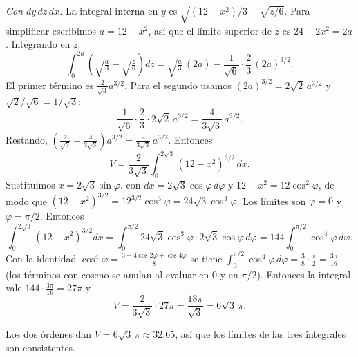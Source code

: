 \begin{respuesta}
    \medskip
    \emph{Con $dy\,dz\,dx$.} La integral interna en $y$ es
    $\sqrt{(12-x^2)/3}-\sqrt{z/6}$. Para simplificar escribimos $a=12-x^2$, así que el
    límite superior de $z$ es $24-2x^2=2a$. Integrando en $z$:
    \[
        \int_0^{2a}\left(\sqrt{\tfrac{a}{3}}-\sqrt{\tfrac{z}{6}}\right)dz
        = \sqrt{\tfrac{a}{3}}\,(2a) - \frac{1}{\sqrt6}\cdot\frac23\,(2a)^{3/2}.
    \]
    El primer término es $\frac{2}{\sqrt3}a^{3/2}$. Para el segundo usamos
    $(2a)^{3/2}=2\sqrt2\,a^{3/2}$ y $\sqrt2/\sqrt6=1/\sqrt3$:
    \[
        \frac{1}{\sqrt6}\cdot\frac23\cdot 2\sqrt2\,a^{3/2} = \frac{4}{3\sqrt3}\,a^{3/2}.
    \]
    Restando, $\left(\frac{2}{\sqrt3}-\frac{4}{3\sqrt3}\right)a^{3/2}=\frac{2}{3\sqrt3}\,a^{3/2}$. Entonces
    \[
        V = \frac{2}{3\sqrt3}\int_0^{2\sqrt3}(12-x^2)^{3/2}\,dx .
    \]
    Sustituimos $x=2\sqrt3\sin\varphi$, con $dx=2\sqrt3\cos\varphi\,d\varphi$ y
    $12-x^2=12\cos^2\varphi$, de modo que $(12-x^2)^{3/2}=12^{3/2}\cos^3\varphi=24\sqrt3\cos^3\varphi$.
    Los límites son $\varphi=0$ y $\varphi=\pi/2$. Entonces
    \[
        \int_0^{2\sqrt3}(12-x^2)^{3/2}dx = \int_0^{\pi/2} 24\sqrt3\cos^3\varphi\cdot 2\sqrt3\cos\varphi\,d\varphi
        = 144\int_0^{\pi/2}\cos^4\varphi\,d\varphi .
    \]
    Con la identidad $\cos^4\varphi=\frac{3+4\cos2\varphi+\cos4\varphi}{8}$ se tiene
    $\int_0^{\pi/2}\cos^4\varphi\,d\varphi=\frac{3}{8}\cdot\frac{\pi}{2}=\frac{3\pi}{16}$
    (los términos con coseno se anulan al evaluar en $0$ y en $\pi/2$). Entonces la integral
    vale $144\cdot\frac{3\pi}{16}=27\pi$ y
    \[
        V = \frac{2}{3\sqrt3}\cdot 27\pi = \frac{18\pi}{\sqrt3} = 6\sqrt3\,\pi .
    \]

    \medskip
    Los dos órdenes dan $V=6\sqrt{3}\,\pi\approx 32.65$, así que los límites de las tres
    integrales son consistentes.

    
\end{respuesta}
